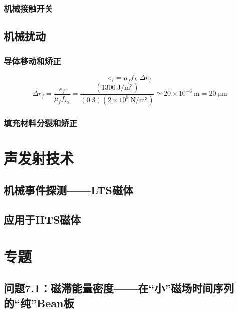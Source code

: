 \subsubsection*{机械接触开关}

\subsection{机械扰动}

\subsubsection*{导体移动和矫正}
\begin{equation}%
e_f=\mu_ff_{L_r}\Delta r_f
\end{equation}
\begin{equation}%
\Delta r_f=\frac{e_f}{\mu_ff_{L_r}}=\frac{(1300\ \mathrm{J/m^3})}{(0.3)(2\times 10^8\ \mathrm{N/m^3})}\simeq 20\times 10^{-6}\ \mathrm{m}=20\ \mathrm{\mu m}
\end{equation}


\subsubsection*{填充材料分裂和矫正}

\section{声发射技术}
\subsection{机械事件探测——LTS磁体}

\subsection{应用于HTS磁体}




\section{专题}
\subsection{问题7.1：磁滞能量密度——在“小”磁场时间序列的“纯”Bean板}

